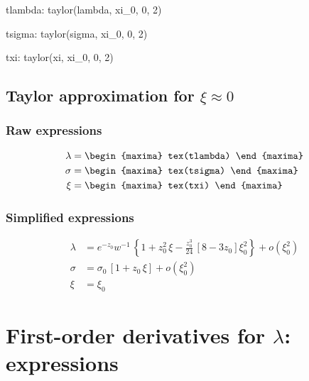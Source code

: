 {\footnotesize
\begin{maxima}
  tlambda: taylor(lambda, xi_0, 0, 2)
\end{maxima}
\begin{maxima}
  tsigma: taylor(sigma, xi_0, 0, 2)
\end{maxima}
\begin{maxima}
  txi: taylor(xi, xi_0, 0, 2)
\end{maxima}
}

\subsection{Taylor approximation for $\xi \approx 0$}

\subsubsection*{Raw expressions}

{\footnotesize \color{MonVertF}
\begin{align*}
\lambda &= 
\begin{maxima}
  tex(tlambda)
\end{maxima} \\
\sigma &= 
\begin{maxima}
  tex(tsigma)
\end{maxima}\\
  \xi &= 
\begin{maxima}
  tex(txi)
\end{maxima}
\end{align*}
}

\subsubsection*{Simplified expressions}

{\color{red}
\begin{align*}
  \lambda &= e^{-z_0} w^{-1} \,  \left\{ 1 + z_0^2 \, \xi -
            \frac{z_0^3}{24}\, \left[ 8 - 3 z_0 \right] \xi_0^2 \right\}
            + o(\xi_0^2)\\
  \sigma &= \sigma_0 \,  \left[ 1 + z_0 \, \xi  \right] + o(\xi_0^2)\\
  \xi &= \xi_0
\end{align*}
}



\section{First-order derivatives for $\lambda$: expressions}


